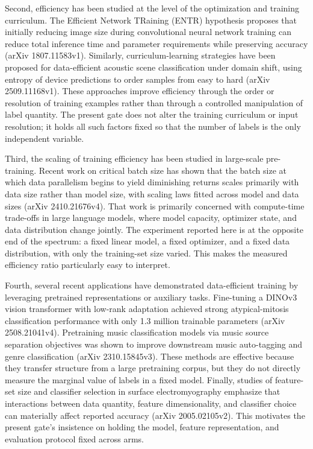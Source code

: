 \documentclass[10pt]{article}
\begin{document}
Second, efficiency has been studied at the level of the optimization and training curriculum. The Efficient Network TRaining (ENTR) hypothesis proposes that initially reducing image size during convolutional neural network training can reduce total inference time and parameter requirements while preserving accuracy (arXiv 1807.11583v1). Similarly, curriculum-learning strategies have been proposed for data-efficient acoustic scene classification under domain shift, using entropy of device predictions to order samples from easy to hard (arXiv 2509.11168v1). These approaches improve efficiency through the order or resolution of training examples rather than through a controlled manipulation of label quantity. The present gate does not alter the training curriculum or input resolution; it holds all such factors fixed so that the number of labels is the only independent variable.

Third, the scaling of training efficiency has been studied in large-scale pre-training. Recent work on critical batch size has shown that the batch size at which data parallelism begins to yield diminishing returns scales primarily with data size rather than model size, with scaling laws fitted across model and data sizes (arXiv 2410.21676v4). That work is primarily concerned with compute-time trade-offs in large language models, where model capacity, optimizer state, and data distribution change jointly. The experiment reported here is at the opposite end of the spectrum: a fixed linear model, a fixed optimizer, and a fixed data distribution, with only the training-set size varied. This makes the measured efficiency ratio particularly easy to interpret.

Fourth, several recent applications have demonstrated data-efficient training by leveraging pretrained representations or auxiliary tasks. Fine-tuning a DINOv3 vision transformer with low-rank adaptation achieved strong atypical-mitosis classification performance with only 1.3 million trainable parameters (arXiv 2508.21041v4). Pretraining music classification models via music source separation objectives was shown to improve downstream music auto-tagging and genre classification (arXiv 2310.15845v3). These methods are effective because they transfer structure from a large pretraining corpus, but they do not directly measure the marginal value of labels in a fixed model. Finally, studies of feature-set size and classifier selection in surface electromyography emphasize that interactions between data quantity, feature dimensionality, and classifier choice can materially affect reported accuracy (arXiv 2005.02105v2). This motivates the present gate's insistence on holding the model, feature representation, and evaluation protocol fixed across arms.
\end{document}
